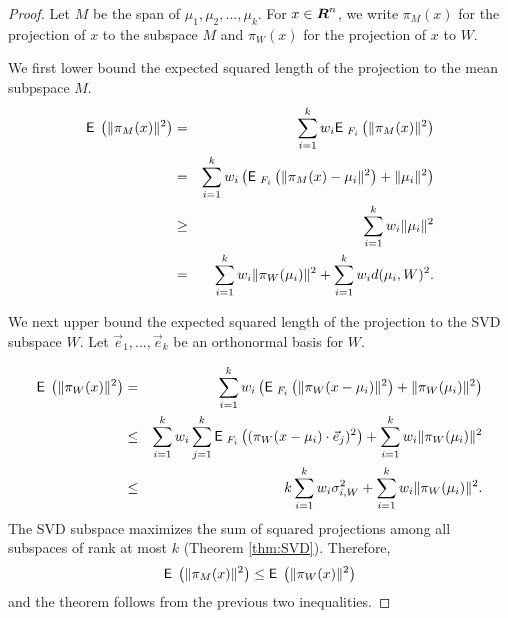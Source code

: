 \documentclass{book}
\numberwithin{exercise}{chapter}
\begin{document}
\begin{proof}
Let $M$ be the span of $\mu_1,\mu_2,\ldots,\mu_k$.
For $x\in \mbox{\mbox{\boldmath $R$}}^n$, we write $\pi_M(x)$ for the projection of
$x$ to the subspace $M$ and $\pi_W(x)$ for the projection of $x$ to $W$.

We first lower bound the expected squared length of the projection to the mean subpspace $M$.
\begin{eqnarray*}
\hbox{{\sf E}\;}\left(\|\pi_M(x)\|^2\right) &=& \sum_{i=1}^k w_i\hbox{{\sf E}\;}_{F_i}\left(\|\pi_M(x)\|^2\right)\\
&=& \sum_{i=1}^k w_i\left(\hbox{{\sf E}\;}_{F_i}\left(\|\pi_M(x)- \mu_i\|^2\right)
                           +\|\mu_i\|^2\right)\\
   &\geq& \sum_{i=1}^k w_i\|\mu_i\|^2\\
&=& \sum_{i=1}^k w_i \|\pi_W(\mu_i)\|^2 +
            \sum_{i=1}^k w_i d(\mu_i,W)^2.
\end{eqnarray*}

We next upper bound the expected squared length of the projection to the SVD subspace $W$.
Let $\vec e_1,...,\vec e_k$ be an orthonormal basis for $W$.

\begin{eqnarray*}
\hbox{{\sf E}\;}\left(\|\pi_W(x)\|^2\right) &=&\sum_{i=1}^k w_i\left( \hbox{{\sf E}\;}_{F_i}\left(\|\pi_W(x-\mu_i)\|^2\right)
                                 +\|\pi_W(\mu_i)\|^2\right)\\
&\leq&\sum_{i=1}^kw_i\sum_{j=1}^k\hbox{{\sf E}\;}_{F_i}\left((\pi_W(x-\mu_i)\cdot \vec e_j)^2\right)+
 \sum_{i=1}^k w_i\|\pi_W(\mu_i)\|^2\\
&\leq& k\sum_{i=1}^k w_i\sigma_{i,W}^2 +
    \sum_{i=1}^k w_i\|\pi_W(\mu_i)\|^2.
\end{eqnarray*}
The SVD subspace maximizes the sum of squared projections
among all subspaces of rank at most $k$ (Theorem \ref{thm:SVD}).
Therefore,
\[
\hbox{{\sf E}\;}\left(\|\pi_M(x)\|^2\right) \le \hbox{{\sf E}\;}\left(\|\pi_W(x)\|^2\right)
\]
and the theorem follows from the previous two inequalities.
\end{proof}
\end{document}
